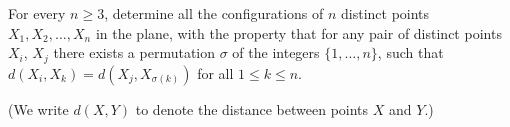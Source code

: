 For every $n\geq 3$, determine all the configurations of $n$ distinct points $X_1,X_2,\ldots,X_n$ in the plane, with the property that for any pair of distinct points $X_i$, $X_j$ there exists a permutation $\sigma$ of the integers $\{1,\ldots,n\}$, such that $d(X_i,X_k) = d(X_j,X_{\sigma(k)})$ for all $1\leq k \leq n$.

(We write $d(X,Y)$ to denote the distance between points $X$ and $Y$.)